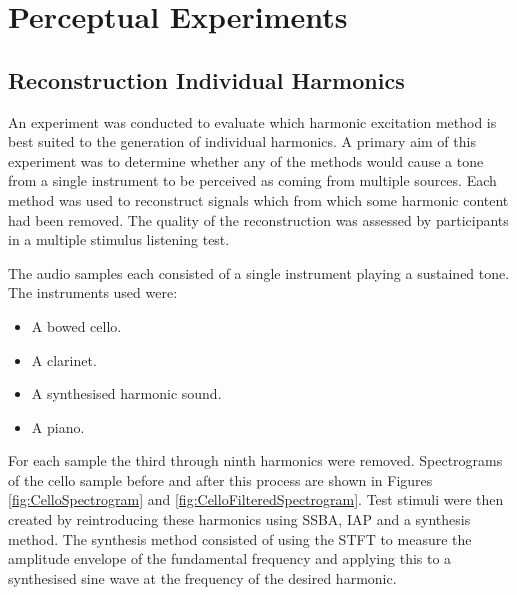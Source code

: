 \chapter{Perceptual Experiments}
\label{chap:PerceptualExperiments}

\section{Reconstruction Individual Harmonics}
\label{sec:PerceptualExperiments-Reconstruction}
	An experiment was conducted to evaluate which harmonic excitation method is best suited to the generation of
	individual harmonics. A primary aim of this experiment was to determine whether any of the methods would cause a
	tone from a single instrument to be perceived as coming from multiple sources. Each method was used to reconstruct
	signals which from which some harmonic content had been removed. The quality of the reconstruction was assessed by
	participants in a multiple stimulus listening test. 

	The audio samples each consisted of a single instrument playing a sustained tone. The instruments used were:

	\begin{itemize}
		\item A bowed cello.
		\item A clarinet.
		\item A synthesised harmonic sound.
		\item A piano.
	\end{itemize}

	For each sample the third through ninth harmonics were removed. Spectrograms of the cello sample before and after
	this process are shown in Figures \ref{fig:CelloSpectrogram} and \ref{fig:CelloFilteredSpectrogram}.  Test stimuli
	were then created by reintroducing these harmonics using SSBA, IAP and a synthesis method.  The synthesis method
	consisted of using the STFT to measure the amplitude envelope of the fundamental frequency and applying this to a
	synthesised sine wave at the frequency of the desired harmonic. 

